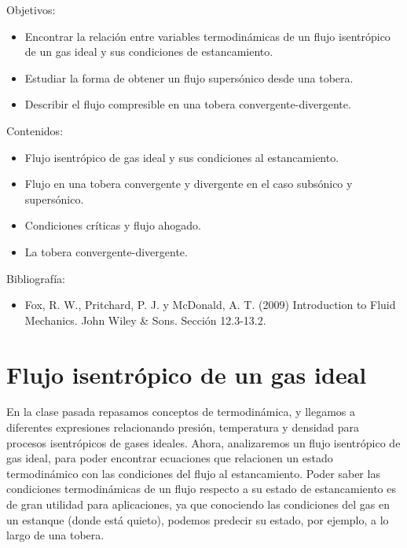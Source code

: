\begin{framed}

Objetivos:
\begin{itemize}
    \item Encontrar la relación entre variables termodinámicas de un flujo isentrópico de un gas ideal y sus condiciones de estancamiento.
    \item Estudiar la forma de obtener un flujo supersónico desde una tobera.
    \item Describir el flujo compresible en una tobera convergente-divergente.
\end{itemize}

Contenidos:
\begin{itemize}
    \item Flujo isentrópico de gas ideal y sus condiciones al estancamiento. 
    \item Flujo en una tobera convergente y divergente en el caso subsónico y supersónico. 
    \item Condiciones críticas y flujo ahogado.
    \item La tobera convergente-divergente.
\end{itemize}

Bibliografía:
\begin{itemize}
    \item Fox, R. W., Pritchard, P. J. y McDonald, A. T. (2009) Introduction to Fluid Mechanics. John Wiley \& Sons. Sección 12.3-13.2.
\end{itemize}
\end{framed}

\section*{Flujo isentrópico de un gas ideal}

En la clase pasada repasamos conceptos de termodinámica, y llegamos a diferentes expresiones relacionando presión, temperatura y densidad para procesos isentrópicos de gases ideales. 
Ahora, analizaremos un flujo isentrópico de gas ideal, para poder encontrar ecuaciones que relacionen un estado termodinámico con las condiciones del flujo al estancamiento.
Poder saber las condiciones termodinámicas de un flujo respecto a su estado de estancamiento es de gran utilidad para aplicaciones, ya que conociendo las condiciones del gas en un estanque (donde está quieto), podemos predecir su estado, por ejemplo, a lo largo de una tobera.

